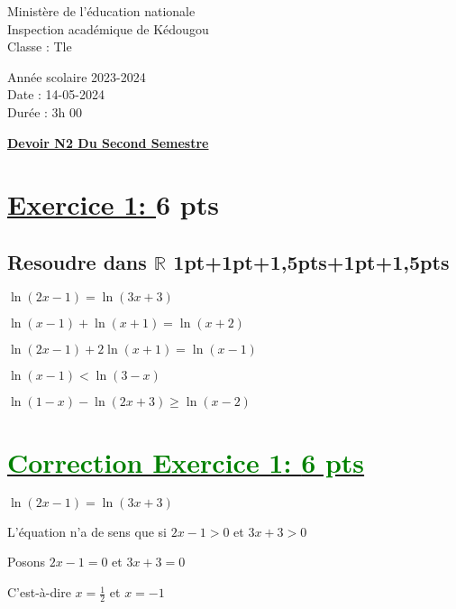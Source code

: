 \documentclass[12pt]{article}
\begin{document}
\begin{minipage}{0.5\textwidth}
	Ministère de l'éducation nationale  \\
	Inspection académique de Kédougou   \\
	Classe : Tle  \\
\end{minipage}
\begin{minipage}{0.5\textwidth}
	Année scolaire 2023-2024 \\
	Date : 14-05-2024 \\
	Durée : 3h 00 \\
\end{minipage}

\begin{center}
	\textbf{{\underline{Devoir N2 Du Second Semestre}}}
\end{center}
\section*{\underline{Exercice 1: }\textbf{6 pts}}
\subsection*{ Resoudre dans $\mathbb{R}$ 1pt+1pt+1,5pts+1pt+1,5pts}
$\ln(2x-1)=\ln(3x+3)$

$\ln(x-1)+\ln(x+1)=\ln(x+2)$

$\ln(2x-1)+2\ln(x+1)=\ln(x-1)$

$\ln(x-1)<\ln(3-x)$

$\ln(1-x)-\ln(2x+3)\geq\ln(x-2)$
\section*{\underline{\textcolor{green}{Correction Exercice 1: \textbf{6 pts}}}}
$\ln(2x-1)=\ln(3x+3)$

L'équation n'a de sens que si $2x-1>0$ et $3x+3>0$

Posons $2x-1=0$ et $3x+3=0$

C'est-à-dire $x=\frac{1}{2}$ et $x=-1$
\end{document}
